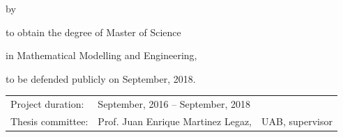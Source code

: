 \begin{titlepage}


\begin{center}


{\makeatletter
\largetitlestyle\fontsize{64}{94}\selectfont\@title
\makeatother}

{\makeatletter
\ifx\@subtitle\undefined\else
    \bigskip
   {\tudsffamily\fontsize{22}{32}\selectfont\@subtitle}    
\fi
\makeatother}

\bigskip
\bigskip

by

\bigskip
\bigskip

{\makeatletter
\largetitlestyle\fontsize{26}{26}\selectfont\@author
\makeatother}

\bigskip
\bigskip

to obtain the degree of Master of Science

in Mathematical Modelling and Engineering,

to be defended publicly on September, 2018.

\vfill

\begin{tabular}{lll}
    Project duration: & \multicolumn{2}{l}{September, 2016 -- September, 2018}\\
    Thesis committee: & Prof. Juan Enrique Martinez Legaz, & UAB, supervisor \\
\end{tabular}

\bigskip
\bigskip



\end{center}
\end{titlepage}
